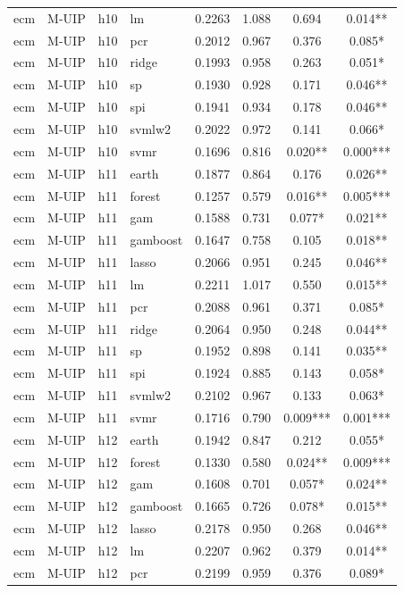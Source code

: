 \begin{ThreePartTable}
\begin{longtable}[t]{llclcccc}
ecm & M-UIP & h10 & lm & 0.2263 & 1.088 & 0.694 & 0.014**\\
ecm & M-UIP & h10 & pcr & 0.2012 & 0.967 & 0.376 & 0.085*\\
ecm & M-UIP & h10 & ridge & 0.1993 & 0.958 & 0.263 & 0.051*\\
ecm & M-UIP & h10 & sp & 0.1930 & 0.928 & 0.171 & 0.046**\\
ecm & M-UIP & h10 & spi & 0.1941 & 0.934 & 0.178 & 0.046**\\
ecm & M-UIP & h10 & svmlw2 & 0.2022 & 0.972 & 0.141 & 0.066*\\
ecm & M-UIP & h10 & svmr & 0.1696 & 0.816 & 0.020** & 0.000***\\
\addlinespace
ecm & M-UIP & h11 & earth & 0.1877 & 0.864 & 0.176 & 0.026**\\
ecm & M-UIP & h11 & forest & 0.1257 & 0.579 & 0.016** & 0.005***\\
ecm & M-UIP & h11 & gam & 0.1588 & 0.731 & 0.077* & 0.021**\\
ecm & M-UIP & h11 & gamboost & 0.1647 & 0.758 & 0.105 & 0.018**\\
ecm & M-UIP & h11 & lasso & 0.2066 & 0.951 & 0.245 & 0.046**\\
ecm & M-UIP & h11 & lm & 0.2211 & 1.017 & 0.550 & 0.015**\\
ecm & M-UIP & h11 & pcr & 0.2088 & 0.961 & 0.371 & 0.085*\\
ecm & M-UIP & h11 & ridge & 0.2064 & 0.950 & 0.248 & 0.044**\\
ecm & M-UIP & h11 & sp & 0.1952 & 0.898 & 0.141 & 0.035**\\
ecm & M-UIP & h11 & spi & 0.1924 & 0.885 & 0.143 & 0.058*\\
ecm & M-UIP & h11 & svmlw2 & 0.2102 & 0.967 & 0.133 & 0.063*\\
ecm & M-UIP & h11 & svmr & 0.1716 & 0.790 & 0.009*** & 0.001***\\
\addlinespace
ecm & M-UIP & h12 & earth & 0.1942 & 0.847 & 0.212 & 0.055*\\
ecm & M-UIP & h12 & forest & 0.1330 & 0.580 & 0.024** & 0.009***\\
ecm & M-UIP & h12 & gam & 0.1608 & 0.701 & 0.057* & 0.024**\\
ecm & M-UIP & h12 & gamboost & 0.1665 & 0.726 & 0.078* & 0.015**\\
ecm & M-UIP & h12 & lasso & 0.2178 & 0.950 & 0.268 & 0.046**\\
ecm & M-UIP & h12 & lm & 0.2207 & 0.962 & 0.379 & 0.014**\\
ecm & M-UIP & h12 & pcr & 0.2199 & 0.959 & 0.376 & 0.089*\\

\end{longtable}
\end{ThreePartTable}
